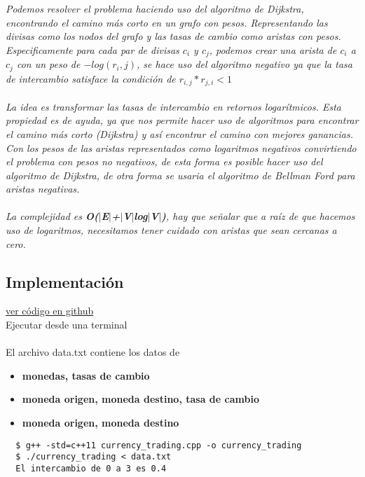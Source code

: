 \documentclass{article}
\begin{document}
\textit{Podemos resolver el problema haciendo uso del algoritmo de Dijkstra, encontrando el camino más corto en un grafo con pesos. Representando las divisas como los nodos del grafo y las tasas de cambio como aristas con pesos. Especificamente para cada par de divisas $c_{i}$ y $c_{j}$, podemos crear una arista de $c_{i}$ a $c_{j}$ con un peso de $-log(r_{i},j)$, se hace uso del algoritmo negativo ya que la tasa de intercambio satisface la condición de $r_{i,j}*r_{j,i} < 1$\\\\ La idea es transformar las tasas de intercambio en retornos logarítmicos. Esta propiedad es de ayuda, ya que nos permite hacer uso de algoritmos para encontrar el camino más corto (Dijkstra) y así encontrar el camino con mejores ganancias. \\ Con los pesos de las aristas representados como logaritmos negativos convirtiendo el problema con pesos no negativos, de esta forma es posible hacer uso del algoritmo de Dijkstra, de otra forma se usaria el algoritmo de Bellman Ford para aristas negativas.\\\\ La complejidad es \textbf{O($|$E$|$+$|$V$|$log$|$V$|$)}, hay que señalar que a raíz de que hacemos uso de logaritmos, necesitamos tener cuidado con aristas que sean cercanas a cero.}

\subsection{Implementación}
\href{https://github.com/luisballado/ADA/tree/main/practice_code/tarea5/currency_trading}{ver código en github}\\

Ejecutar desde una terminal\\\\

El archivo data.txt contiene los datos de
\begin{itemize}
\item \textbf{monedas, tasas de cambio}
\item \textbf{moneda origen, moneda destino, tasa de cambio}
\item \textbf{moneda origen, moneda destino}
\end{itemize}

\begin{commandline}
\begin{verbatim}
  $ g++ -std=c++11 currency_trading.cpp -o currency_trading
  $ ./currency_trading < data.txt
  El intercambio de 0 a 3 es 0.4
\end{verbatim}
\end{commandline}
\end{document}

